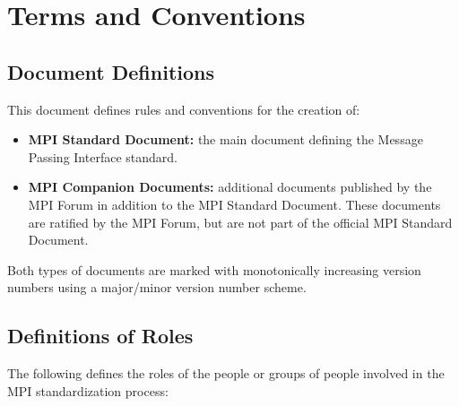\chapter{Terms and Conventions}


\section{Document Definitions}

This document defines rules and conventions for the creation of:

\begin{itemize}
\item {\bf MPI Standard Document:} the main document defining the
  Message Passing Interface standard.
\item {\bf MPI Companion Documents:} additional documents published by
  the MPI Forum in addition to the MPI Standard Document. These
  documents are ratified by the MPI Forum, but are not part of the
  official MPI Standard Document.
\end{itemize}

Both types of documents are marked with monotonically increasing version numbers using a major/minor version number scheme.

\section{Definitions of Roles}

The following defines the roles of the people or groups of people
involved in the MPI standardization process:

